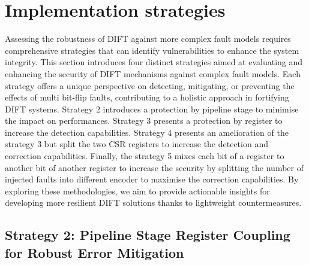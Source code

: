 \section{Implementation strategies}
\label{section:chap6_implem_strategies}

Assessing the robustness of DIFT against more complex fault models requires comprehensive strategies that can identify vulnerabilities to enhance the system integrity. This section introduces four distinct strategies aimed at evaluating and enhancing the security of DIFT mechanisms against complex fault models. Each strategy offers a unique perspective on detecting, mitigating, or preventing the effects of multi bit-flip faults, contributing to a holistic approach in fortifying DIFT systems.
Strategy 2 introduces a protection by pipeline stage to minimise the impact on performances. Strategy 3 presents a protection by register to increase the detection capabilities. Strategy 4 presents an amelioration of the strategy 3 but split the two CSR registers to increase the detection and correction capabilities. Finally, the strategy 5 mixes each bit of a register to another bit of another register to increase the security by splitting the number of injected faults into different encoder to maximise the correction capabilities.
By exploring these methodologies, we aim to provide actionable insights for developing more resilient DIFT solutions thanks to lightweight countermeasures.

\subsection{Strategy 2: Pipeline Stage Register Coupling for Robust Error Mitigation}

